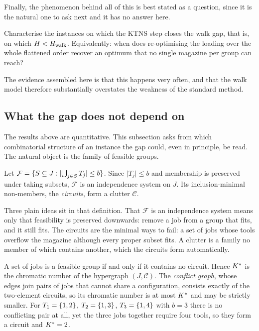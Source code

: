 Finally, the phenomenon behind all of this is best stated as a question, since
it is the natural one to ask next and it has no answer here.

\begin{problem}\label{prob:ktns-closes}
Characterise the instances on which the KTNS step closes the walk gap, that is, on
which $H<H_{\mathrm{walk}}$. Equivalently: when does re-optimising the loading over the whole
flattened order recover an optimum that no single magazine per group can reach?
\end{problem}

The evidence assembled here is that this happens very often, and that the walk model
therefore substantially overstates the weakness of the standard method.

\subsection{What the gap does not depend on}\label{ssec:clutter}

The results above are quantitative. This subsection asks from which combinatorial
structure of an instance the gap could, even in principle, be read. The natural
object is the family of feasible groups.

\begin{definition}\label{def:complex}
Let $\mathcal{F}=\{S\subseteq J:\lvert\bigcup_{j\in S}T_j\rvert\le b\}$. Since
$\lvert T_j\rvert\le b$ and membership is preserved under taking subsets,
$\mathcal{F}$ is an independence system on $J$. Its inclusion-minimal non-members,
the \emph{circuits}, form a clutter $\mathcal{C}$.
\end{definition}

Three plain ideas sit in that definition. That $\mathcal{F}$ is an independence system
means only that feasibility is preserved downwards: remove a job from a group that
fits, and it still fits. The circuits are the minimal ways to fail: a set of jobs
whose tools overflow the magazine although every proper subset fits. A clutter is a
family no member of which contains another, which the circuits form automatically.

\begin{proposition}\label{prop:chromK}
A set of jobs is a feasible group if and only if it contains no circuit. Hence $K^{\ast}$
is the chromatic number of the hypergraph $(J,\mathcal{C})$. The \emph{conflict
graph}, whose edges join pairs of jobs that cannot share a configuration, consists
exactly of the two-element circuits, so its chromatic number is at most $K^{\ast}$ and
may be strictly smaller. For $T_1=\{1,2\}$, $T_2=\{1,3\}$, $T_3=\{1,4\}$
with $b=3$ there is no conflicting pair at all, yet the three jobs together require
four tools, so they form a circuit and $K^{\ast}=2$.
\end{proposition}

